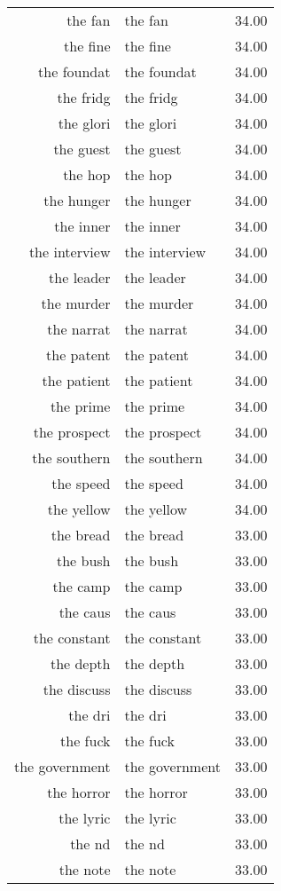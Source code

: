 \begin{table}[ht]
\begin{tabular}{rlr}
  the fan & the fan & 34.00 \\ 
  the fine & the fine & 34.00 \\ 
  the foundat & the foundat & 34.00 \\ 
  the fridg & the fridg & 34.00 \\ 
  the glori & the glori & 34.00 \\ 
  the guest & the guest & 34.00 \\ 
  the hop & the hop & 34.00 \\ 
  the hunger & the hunger & 34.00 \\ 
  the inner & the inner & 34.00 \\ 
  the interview & the interview & 34.00 \\ 
  the leader & the leader & 34.00 \\ 
  the murder & the murder & 34.00 \\ 
  the narrat & the narrat & 34.00 \\ 
  the patent & the patent & 34.00 \\ 
  the patient & the patient & 34.00 \\ 
  the prime & the prime & 34.00 \\ 
  the prospect & the prospect & 34.00 \\ 
  the southern & the southern & 34.00 \\ 
  the speed & the speed & 34.00 \\ 
  the yellow & the yellow & 34.00 \\ 
  the bread & the bread & 33.00 \\ 
  the bush & the bush & 33.00 \\ 
  the camp & the camp & 33.00 \\ 
  the caus & the caus & 33.00 \\ 
  the constant & the constant & 33.00 \\ 
  the depth & the depth & 33.00 \\ 
  the discuss & the discuss & 33.00 \\ 
  the dri & the dri & 33.00 \\ 
  the fuck & the fuck & 33.00 \\ 
  the government & the government & 33.00 \\ 
  the horror & the horror & 33.00 \\ 
  the lyric & the lyric & 33.00 \\ 
  the nd & the nd & 33.00 \\ 
  the note & the note & 33.00 \\ 

\end{tabular}
\end{table}
